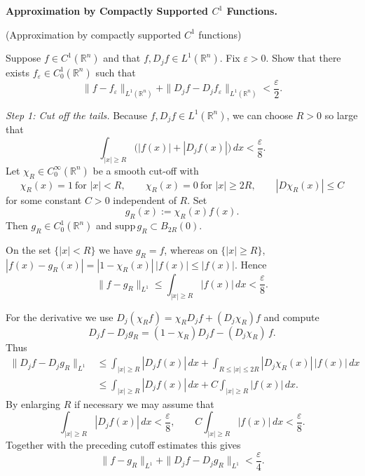 \begin{problem}[CP-II-0383]
\label{prob:cp-ii-0383}
\textbf{Approximation by Compactly Supported \(C^1\) Functions.}

\hspace*{1.5em}(Approximation by compactly supported $C^1$ functions)

Suppose $f\in C^1(\mathbb{R}^n)$ and that $f,D_j f\in L^1(\mathbb{R}^n)$.
Fix $\varepsilon>0$. Show that there exists $f_\varepsilon\in C_0^1(\mathbb{R}^n)$ such that
\[
\|f-f_\varepsilon\|_{L^1(\mathbb{R}^n)}
+\|D_j f-D_j f_\varepsilon\|_{L^1(\mathbb{R}^n)}<\frac{\varepsilon}{2}.
\]
\end{problem}

\begin{solution}
\emph{Step 1: Cut off the tails.}
Because $f,D_j f\in L^1(\mathbb{R}^n)$, we can choose $R>0$ so large that
\begin{equation}
	\int_{|x|\ge R}\big(|f(x)|+|D_j f(x)|\big)\,dx < \frac{\varepsilon}{8}.
\end{equation}
Let $\chi_R\in C_0^\infty(\mathbb{R}^n)$ be a smooth cut-off with
\[
\chi_R(x)=1 \ \text{for } |x|<R, \qquad
\chi_R(x)=0 \ \text{for } |x|\ge 2R, \qquad
|D\chi_R(x)|\le C
\]
for some constant $C>0$ independent of $R$. Set
\[
g_R(x):=\chi_R(x)f(x).
\]
Then $g_R\in C_0^1(\mathbb{R}^n)$ and $\mathrm{supp}\,g_R\subset B_{2R}(0)$.

On the set $\{|x|<R\}$ we have $g_R=f$, whereas on $\{|x|\ge R\}$,
\(
|f(x)-g_R(x)| = |1-\chi_R(x)|\,|f(x)|
\le |f(x)|.
\)
Hence
\begin{equation}
	\|f-g_R\|_{L^1}
	\le \int_{|x|\ge R}|f(x)|\,dx
	< \frac{\varepsilon}{8}.
\end{equation}

For the derivative we use $D_j(\chi_R f)=\chi_R D_j f +(D_j\chi_R)f$ and compute
\[
D_j f - D_j g_R = (1-\chi_R)D_j f - (D_j\chi_R)\,f.
\]
Thus
\begin{equation}
	\begin{aligned}
		\|D_j f-D_j g_R\|_{L^1}
		&\le \int_{|x|\ge R}|D_j f(x)|\,dx
		+ \int_{R\le |x|\le 2R}|D_j\chi_R(x)|\,|f(x)|\,dx \\
		&\le \int_{|x|\ge R}|D_j f(x)|\,dx
		+ C\int_{|x|\ge R}|f(x)|\,dx.
	\end{aligned}
\end{equation}
By enlarging $R$ if necessary we may assume that
\[
\int_{|x|\ge R}|D_j f(x)|\,dx < \frac{\varepsilon}{8},
\qquad
C\int_{|x|\ge R}|f(x)|\,dx < \frac{\varepsilon}{8}.
\]
Together with the preceding cutoff estimates this gives
\[
\|f-g_R\|_{L^1} + \|D_j f-D_j g_R\|_{L^1} < \frac{\varepsilon}{4}.
\]


\end{solution}
